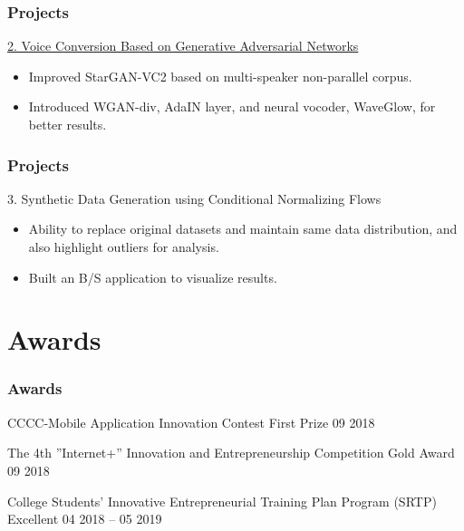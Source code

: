\documentclass{beamer}
\begin{document}
\begin{frame}
    \frametitle{Projects}
    \begin{block}{\href{https://drive.google.com/file/d/1QqgPoRGhaSeS0QWrjnR8mxhvV_onwZ5y/view?usp=drive_link}{2. Voice Conversion Based on Generative Adversarial Networks}}
        \begin{itemize}
            \item Improved StarGAN-VC2 based on multi-speaker non-parallel corpus.
            \item Introduced WGAN-div, AdaIN layer, and neural vocoder, WaveGlow, for better results.
        \end{itemize}
    \end{block}
\end{frame}

\begin{frame}
    \frametitle{Projects}
    \begin{block}{3. Synthetic Data Generation using Conditional Normalizing Flows}
        \begin{itemize}
            \item Ability to replace original datasets and maintain same data distribution, and also highlight outliers for analysis.
            \item Built an B/S application to visualize results.
        \end{itemize}
    \end{block}
\end{frame}


\section{Awards}
\begin{frame}
    \frametitle{Awards}
    \begin{block}{CCCC-Mobile Application Innovation Contest}
        First Prize \hfill 09 2018
    \end{block}
    \begin{block}{The 4th ”Internet+” Innovation and Entrepreneurship Competition}
        Gold Award \hfill 09 2018
    \end{block}
    \begin{block}{College Students’ Innovative Entrepreneurial Training Plan Program (SRTP)}
        Excellent \hfill 04 2018 – 05 2019
    \end{block}
\end{frame}
\end{document}
